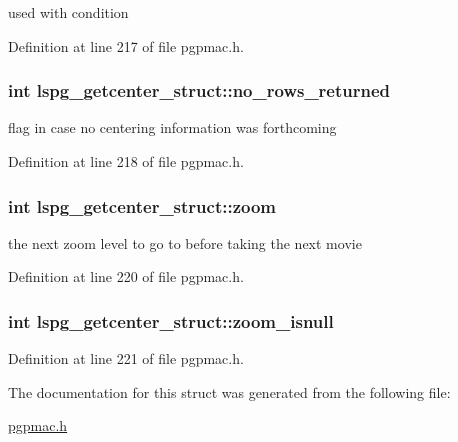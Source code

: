 used with condition 



Definition at line 217 of file pgpmac.\-h.

\hypertarget{structlspg__getcenter__struct_aaeb0ccf4289b4fb306c2bc04ae85b237}{
\subsubsection[{no\-\_\-rows\-\_\-returned}]{\setlength{\rightskip}{0pt plus 5cm}int lspg\-\_\-getcenter\-\_\-struct\-::no\-\_\-rows\-\_\-returned}}\label{structlspg__getcenter__struct_aaeb0ccf4289b4fb306c2bc04ae85b237}


flag in case no centering information was forthcoming 



Definition at line 218 of file pgpmac.\-h.

\hypertarget{structlspg__getcenter__struct_a63e640a925611d2404a1529aea30a853}{
\subsubsection[{zoom}]{\setlength{\rightskip}{0pt plus 5cm}int lspg\-\_\-getcenter\-\_\-struct\-::zoom}}\label{structlspg__getcenter__struct_a63e640a925611d2404a1529aea30a853}


the next zoom level to go to before taking the next movie 



Definition at line 220 of file pgpmac.\-h.

\hypertarget{structlspg__getcenter__struct_a6ca85a8de29039188357b2814acd7803}{
\subsubsection[{zoom\-\_\-isnull}]{\setlength{\rightskip}{0pt plus 5cm}int lspg\-\_\-getcenter\-\_\-struct\-::zoom\-\_\-isnull}}\label{structlspg__getcenter__struct_a6ca85a8de29039188357b2814acd7803}


Definition at line 221 of file pgpmac.\-h.



The documentation for this struct was generated from the following file\-:\begin{DoxyCompactItemize}
\item 
\hyperlink{pgpmac_8h}{pgpmac.\-h}\end{DoxyCompactItemize}
